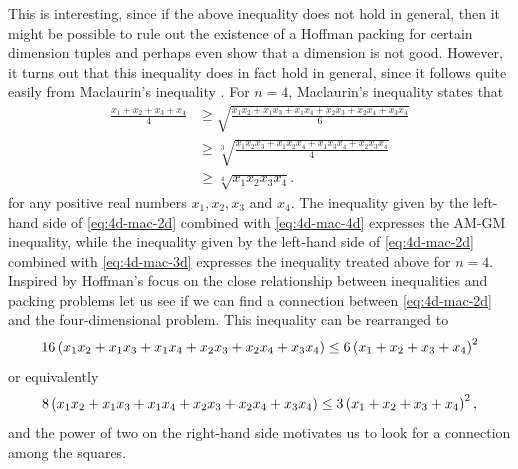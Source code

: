 \noindent This is interesting, since if the above inequality does not hold in general, then it might be possible to rule out the existence of a Hoffman packing for certain dimension tuples and perhaps even show that a dimension is not good. However, it turns out that this inequality does in fact hold in general, since it follows quite easily \cite{Martin2017} from Maclaurin's inequality \cite[p. 188]{Cvetkovski2012}. For $n = 4$, Maclaurin's inequality states that
\begin{align}
\frac{x_1 + x_2 + x_3 + x_4}{4}
&\ge \sqrt{\frac{x_1x_2 + x_1x_3 + x_1x_4 + x_2x_3 + x_2x_4 + x_3x_4}{6}}\label{eq:4d-mac-2d}\\
&\ge \sqrt[3]{\frac{x_1x_2x_3 + x_1x_2x_4 + x_1x_3x_4 + x_2x_3x_4}{4}}\label{eq:4d-mac-3d}\\
&\ge \sqrt[4]{x_1x_2x_3x_4}.\label{eq:4d-mac-4d}
\end{align}
for any positive real numbers $x_1, x_2, x_3$ and $x_4$. The inequality given by the left-hand side of \eqref{eq:4d-mac-2d} combined with \eqref{eq:4d-mac-4d} expresses the AM-GM inequality, while the inequality given by the left-hand side of \eqref{eq:4d-mac-2d} combined with \eqref{eq:4d-mac-3d} expresses the inequality treated above for $n = 4$. Inspired by Hoffman's focus on the close relationship between inequalities and packing problems let us see if we can find a connection between \eqref{eq:4d-mac-2d} and the four-dimensional problem. This inequality can be rearranged to
\begin{equation}\label{eq:4d-mac-2d-six-squares}
16\left( x_1x_2 + x_1x_3 + x_1x_4 + x_2x_3 + x_2x_4 + x_3x_4 \right)
\leq 6\left( x_1 + x_2 + x_3 + x_4 \right)^2
\end{equation}
or equivalently
\begin{equation}\label{eq:4d-mac-2d-three-squares}
8\left( x_1x_2 + x_1x_3 + x_1x_4 + x_2x_3 + x_2x_4 + x_3x_4 \right)
\leq 3\left( x_1 + x_2 + x_3 + x_4 \right)^2,
\end{equation}
and the power of two on the right-hand side motivates us to look for a connection among the squares.


